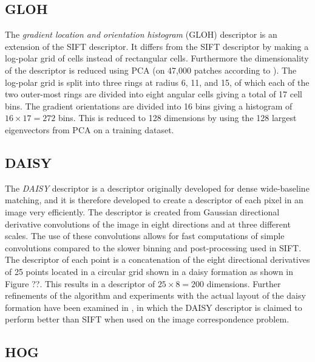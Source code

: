\documentclass[thesis.tex]{subfiles}
\begin{document}
\subsection{GLOH}

The \emph{gradient location and orientation histogram} (GLOH) descriptor
\cite{mikolajczyk2005performance} is an extension of the SIFT descriptor.
It differs from the SIFT descriptor by making a log-polar grid of
cells instead of rectangular cells. Furthermore the dimensionality of
the descriptor is reduced using PCA (on 47,000 patches according to
\cite{mikolajczyk2005performance}). The log-polar grid is split into three
rings at radius 6, 11, and 15, of which each of the two outer-most rings are
divided into eight angular cells giving a total of 17 cell bins. The gradient
orientations are divided into 16 bins giving a histogram of $16 \times 17
= 272$ bins. This is reduced to 128 dimensions by using the 128 largest
eigenvectors from PCA on a training dataset.

\subsection{DAISY}

The \emph{DAISY} descriptor \cite{tola2008fast} is a descriptor originally
developed for dense wide-baseline matching, and it is therefore developed
to create a descriptor of each pixel in an image very efficiently. The
descriptor is created from Gaussian directional derivative convolutions of
the image in eight directions and at three different scales. The use of these
convolutions allows for fast computations of simple convolutions compared
to the slower binning and post-processing used in SIFT. The descriptor of
each point is a concatenation of the eight directional derivatives of 25
points located in a circular grid shown in a daisy formation as shown in
Figure ??. This results in a descriptor of
$25 \times 8 = 200$ dimensions. Further refinements of the algorithm and
experiments with the actual layout of the daisy formation have been examined
in \cite{winder2009picking}, in which the DAISY descriptor is claimed to perform
better than SIFT when used on the image correspondence problem.

\subsection{HOG}
\end{document}
